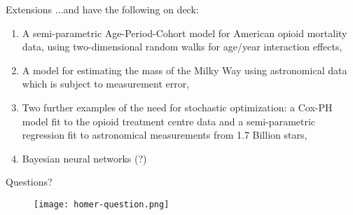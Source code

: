 \documentclass[10pt,usenames,dvipsnames,t]{beamer}
\begin{document}
\begin{frame}{Extensions}
...and have the following on deck:
\pause

\begin{enumerate}
\item A semi-parametric Age-Period-Cohort model for American opioid mortality data, using two-dimensional random walks for age/year interaction effects,
\pause

\item A model for estimating the mass of the Milky Way using astronomical data which is subject to measurement error,
\pause

\item Two further examples of the need for stochastic optimization: a Cox-PH model fit to the opioid treatment centre data and a semi-parametric regression fit to astronomical measurements from 1.7 Billion stars,
\pause

\item Bayesian neural networks (?)
\end{enumerate}

\end{frame}

\begin{frame}


\end{frame}

\begin{frame}{Questions?}
\begin{figure}[h]
\centering
\texttt{[image: homer-question.png]}
\end{figure}
\end{frame}
\end{document}
